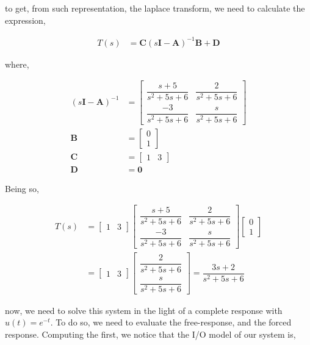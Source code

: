 \documentclass[12pt]{article}
\begin{document}
		to get, from such representation, the laplace transform, we need to calculate the expression,
		
		\begin{align*}
			T(s) &= \mathbf{C}(s\mathbf{I} - \mathbf{A})^{-1}\mathbf{B} + \mathbf{D}
		\end{align*}
		
		where,
		
		\begin{align*}
			(s\mathbf{I}-\mathbf{A})^{-1} &= \begin{bmatrix}
				\dfrac{s+5}{s^{2}+5s+6} & \dfrac{2}{s^{2}+5s+6}\\
				\dfrac{-3}{s^{2}+5s+6} & \dfrac{s}{s^{2}+5s+6}
			\end{bmatrix}\\
			\mathbf{B} &= \begin{bmatrix}
				0\\
				1
			\end{bmatrix}\\
			\mathbf{C} &= \begin{bmatrix}
				1 & 3
			\end{bmatrix}\\
			\mathbf{D} &= \mathbf{0}
		\end{align*}
		
		Being so,
		
		\begin{align*}
			T(s) &= \begin{bmatrix}
				1 & 3
			\end{bmatrix}\begin{bmatrix}
			\dfrac{s+5}{s^{2}+5s+6} & \dfrac{2}{s^{2}+5s+6}\\
			\dfrac{-3}{s^{2}+5s+6} & \dfrac{s}{s^{2}+5s+6}
			\end{bmatrix}\begin{bmatrix}
				0\\
				1
			\end{bmatrix}\\
			&= \begin{bmatrix}
			1 & 3
			\end{bmatrix}\begin{bmatrix}
				\dfrac{2}{s^{2}+5s+6}\\
				\dfrac{s}{s^{2}+5s+6}
			\end{bmatrix} = \dfrac{3s + 2}{s^{2}+5s+6}
		\end{align*}
		
		now, we need to solve this system in the light of a complete response with $u(t) = e^{-t}$. To do so, we need to evaluate the free-response, and the forced response. Computing the first, we notice that the I/O model of our system is,
		
\end{document}
